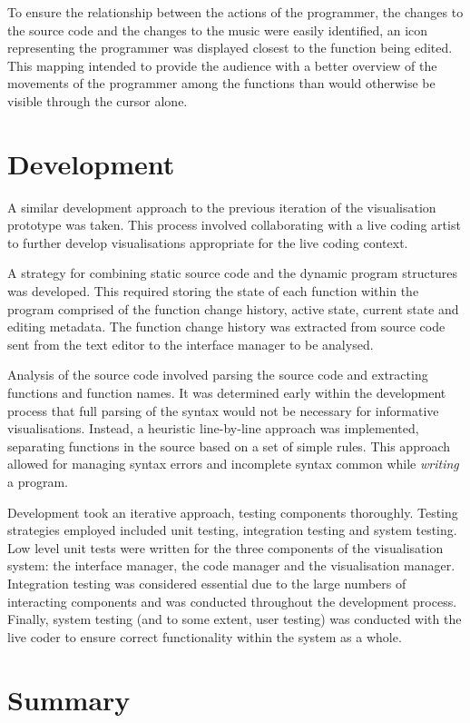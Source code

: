 To ensure the relationship between the actions of the programmer, the changes to the source code and the changes to the music were easily identified, an icon representing the programmer was displayed closest to the function being edited. This mapping intended to provide the audience with a better overview of the movements of the programmer among the functions than would otherwise be visible through the cursor alone.  

\section{Development}

A similar development approach to the previous iteration of the visualisation prototype was taken. This process involved collaborating with a live coding artist to further develop visualisations appropriate for the live coding context.

A strategy for combining static source code and the dynamic program structures was developed. This required storing the state of each function within the program comprised of the function change history, active state, current state and editing metadata. The function change history was extracted from source code sent from the text editor to the interface manager to be analysed.

Analysis of the source code involved parsing the source code and extracting functions and function names. It was determined early within the development process that full parsing of the syntax would not be necessary for informative visualisations. Instead, a heuristic line-by-line approach was implemented, separating functions in the source based on a set of simple rules. This approach allowed for managing syntax errors and incomplete syntax common while \textit{writing} a program. 

Development took an iterative approach, testing components thoroughly. Testing strategies employed included unit testing, integration testing and system testing. Low level unit tests were written for the three components of the visualisation system: the interface manager, the code manager and the visualisation manager. Integration testing was considered essential due to the large numbers of interacting components and was conducted throughout the development process. Finally, system testing (and to some extent, user testing) was conducted with the live coder to ensure correct functionality within the system as a whole.

\section{Summary}

